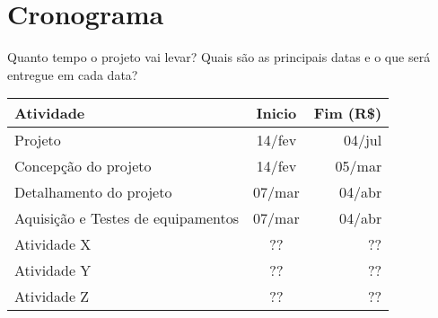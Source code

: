\documentclass{acm_proc_article-sp}
\begin{document}
\section{Cronograma}

Quanto tempo o projeto vai levar?
Quais são as principais datas e o que será entregue em cada data?

\begin{table}[h!]
\centering
\begin{tabular}{l|c|r}
Atividade & Inicio & Fim (R\$) \\
\hline
Projeto & 14/fev & 04/jul \\
\hline
Concepção do projeto & 14/fev & 05/mar \\
Detalhamento do projeto & 07/mar & 04/abr \\
Aquisição e Testes de equipamentos & 07/mar & 04/abr \\
Atividade X & ?? & ?? \\
Atividade Y & ?? & ?? \\
Atividade Z & ?? & ?? \\
\end{tabular}
\label{tab:my_label}
\end{table}
\end{document}
